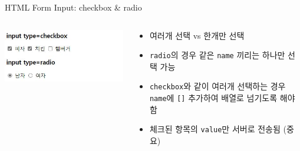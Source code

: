 \documentclass{beamer}
\begin{document}
    \begin{frame}{HTML Form Input: checkbox \& radio}
        \begin{columns}
            \begin{column}{0.35\linewidth}
                \includegraphics[width=\linewidth]{Images/input_check_radio.JPG}
            \end{column}
            \begin{column}{0.65\linewidth}
                \begin{itemize}
                    \item 여러개 선택 vs 한개만 선택
                    \item \texttt{radio}의 경우 같은 \texttt{name} 끼리는 하나만 선택 가능
                    \item \texttt{checkbox}와 같이 여러개 선택하는 경우 \texttt{name}에 \texttt{[]} 추가하여 배열로 넘기도록 해야함
                    \item 체크된 항목의 \texttt{value}만 서버로 전송됨 (중요)
                \end{itemize}
            \end{column}
        \end{columns}
    \end{frame}
\end{document}
